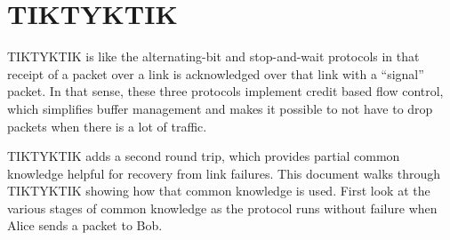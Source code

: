 \section{TIKTYKTIK}

TIKTYKTIK is like the alternating-bit and stop-and-wait protocols in that receipt of a
packet over a link is acknowledged over that link with a “signal” packet. 
In that sense,
these three protocols implement credit based flow control, which simplifies buﬀer management and makes it possible to not have to drop packets when there is a lot of traﬃc.

TIKTYKTIK adds a second round trip, which provides partial common knowledge
helpful for recovery from link failures. This document walks through TIKTYKTIK
showing how that common knowledge is used.
First look at the various stages of common knowledge as the protocol runs without
failure when Alice sends a packet to Bob.

